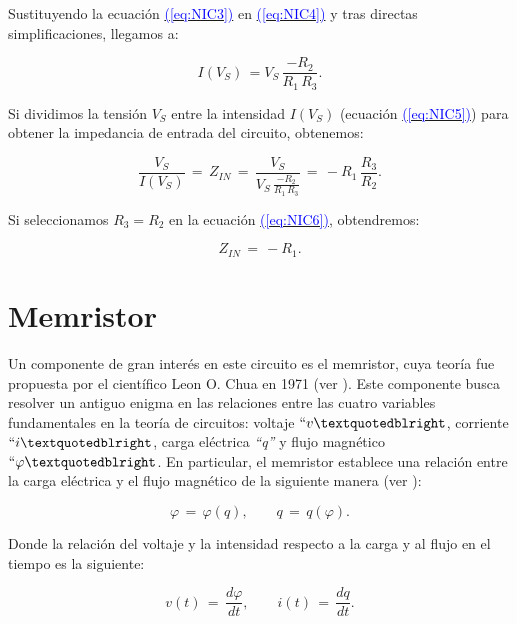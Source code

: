 \documentclass[12pt,a4paper]{report} %
\newcommand{\eref}[1]{\hyperref[#1]{\textcolor{blue}{(\ref*{#1})}}}
\begin{document}
	\noindent Sustituyendo la ecuación \eref{eq:NIC3} en \eref{eq:NIC4} y tras directas simplificaciones, llegamos a:
	
	\begin{equation}
		I(V_S)\,=V_S\,\frac{-R_2}{R_1 \, R_3}.
		\label{eq:NIC5}
	\end{equation}\smallskip
	
	\noindent Si dividimos la tensión $V_S$ entre la intensidad $I(V_S)$ (ecuación \eref{eq:NIC5}) para obtener la impedancia de entrada del circuito, obtenemos:
	
	\begin{equation}
		\frac{V_S}{I(V_S)}\,=\,Z_{IN}\,=\,\frac{V_S}{V_S\,\frac{-R_2}{R_1 \, R_3}}\,=\,-R_1\,\frac{R_3}{R_2}.
		\label{eq:NIC6}
	\end{equation}\smallskip
	
	\noindent Si seleccionamos $R_3 = R_2$ en la ecuación \eref{eq:NIC6}, obtendremos:
	
	\begin{equation}
		Z_{IN}\,=\,-R_1.
		\label{eq:NIC7}
	\end{equation}\smallskip
	
	\newpage
	
	\section{Memristor}
	
	 Un componente de gran interés en este circuito es el memristor, cuya teoría fue propuesta por el científico Leon O. Chua en 1971 (ver \cite{chuamissing1971}). Este componente busca resolver un antiguo enigma en las relaciones entre las cuatro variables fundamentales en la teoría de circuitos: voltaje $`` v \textquotedblright$, corriente $`` i \textquotedblright$, carga eléctrica \textit{``q''} y flujo magnético $``\varphi\textquotedblright$. En particular, el memristor establece una relación entre la carga eléctrica y el flujo magnético de la siguiente manera (ver \cite{chuaoscillator2008}):
	
	\begin{equation}
		\varphi\,=\,\varphi(q), \qquad q\,=\,q(\varphi).
		\label{eq:flujocarga}
	\end{equation}\smallskip
	
	\noindent Donde la relación del voltaje y la intensidad respecto a la carga y al flujo en el tiempo es la siguiente:
	
	\begin{equation}
		v(t)\,=\,\frac{d\varphi}{dt}, \qquad i(t)\,=\,\frac{dq}{dt}.
		\label{eq:dvdi}
	\end{equation}
			
\end{document}
